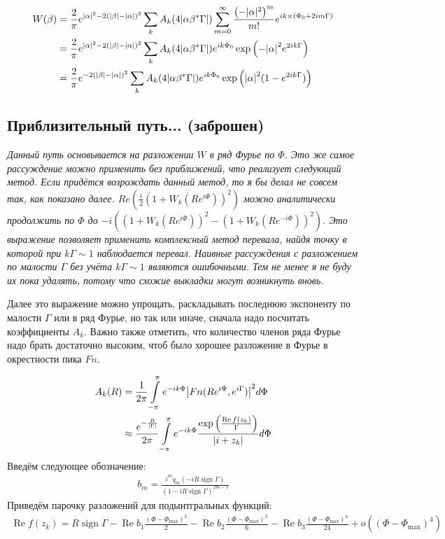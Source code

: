 \documentclass[a4paper, 12pt]{article}
\DeclareMathOperator*{\sign}{sign}
\DeclareMathOperator*{\Real}{Re}
\newenvironment{eqw}{\begin{equation} \begin{aligned}}   
    {\end{aligned}    \end{equation}}
\begin{document}
\begin{eqw}
    W(\beta) &= \frac{2}{\pi}e^{\abs{\alpha}^2-2\left(\abs{\beta} - \abs{\alpha}\right)^2}
    \sum\limits_k A_k(4\abs{\alpha\beta^*\Gamma})
    \sum\limits_{m=0}^{\infty} \frac{\left(-|\alpha|^2\right)^m}{m!}e^{ik\times\left(\Phi_0+2im\Gamma\right)}\\
    &= \frac{2}{\pi}e^{\abs{\alpha}^2-2\left(\abs{\beta} - \abs{\alpha}\right)^2}
    \sum\limits_k A_k(4\abs{\alpha\beta^*\Gamma})e^{ik\Phi_0}
    \exp\left(-\abs{\alpha}^2 e^{2ik\Gamma}\right)\\
    &= \frac{2}{\pi}e^{-2\left(\abs{\beta} - \abs{\alpha}\right)^2}
    \sum\limits_k A_k(4\abs{\alpha\beta^*\Gamma})e^{ik\Phi_0}
    \exp\left(\abs{\alpha}^2 (1-e^{2ik\Gamma})\right)
\end{eqw}

\subsection*{Приблизительный путь... (заброшен)}
\textit{Данный путь основывается на разложении $W$ в ряд Фурье по $\Phi$. Это же самое рассуждение можно применить без приближений, что реализует следующий метод. Если придётся возрождать данный метод, то я бы делал не совсем так, как показано далее. $Re\left(\frac{i}{2}(1+W_k(Re^{i\Phi}))^2\right)$ можно аналитически продолжить по $\Phi$ до $-i\left(\left(1+W_k(Re^{i\Phi})\right)^2 - \left(1+W_k(Re^{-i\Phi})\right)^2\right)$. Это выражение позволяет применить комплексный метод перевала, найдя точку в которой при $k\Gamma\sim 1$ наблюдается перевал. Наивные рассуждения с разложением по малости $\Gamma$ без учёта $k\Gamma\sim 1$ являются ошибочными. Тем не менее я не буду их пока удалять, потому что схожие выкладки могут возникнуть вновь.}

Далее это выражение можно упрощать, раскладывать последнюю экспоненту по малости $\Gamma$ или в ряд Фурье, но так или иначе, сначала надо посчитать коэффициенты $A_k$. Важно также отметить, что количество членов ряда Фурье надо брать достаточно высоким, чтоб было хорошее разложение в Фурье в окрестности пика $Fn$. 

\begin{eqw}
     A_k(R) &= \frac{1}{2\pi}\int\limits_{-\pi}^\pi e^{-ik\Phi} \abs{Fn(Re^{i\Phi}, e^{i\Gamma})}^2 d\Phi \\
    &\approx \frac{e^{-\frac{R}{\abs{\Gamma}}}}{2\pi}\int\limits_{-\pi}^\pi e^{-ik\Phi} 
    \frac{\exp\left(\frac{\Real f(z_k)}{\Gamma}\right)}{\abs{i+z_k}}d\Phi 
\end{eqw}
Введём следующее обозначение:
\begin{eqw}
    b_m = \frac{i^m q_m(-iR\sign\Gamma)}{\left(1-iR\sign \Gamma\right)^{2m-1}}
\end{eqw}
Приведём парочку разложений для подынтгральных функций:
\begin{eqw}
    \Real f(z_k) = R\sign\Gamma - \Real b_1 \frac{\left(\Phi - \Phi_{\max}\right)^2}{2} - \Real b_2 \frac{\left(\Phi - \Phi_{\max}\right)^3}{6} - \Real b_3 \frac{\left(\Phi - \Phi_{\max}\right)^4}{24}+o\left(\left(\Phi - \Phi_{\max}\right)^4\right)
\end{eqw}
\end{document}
